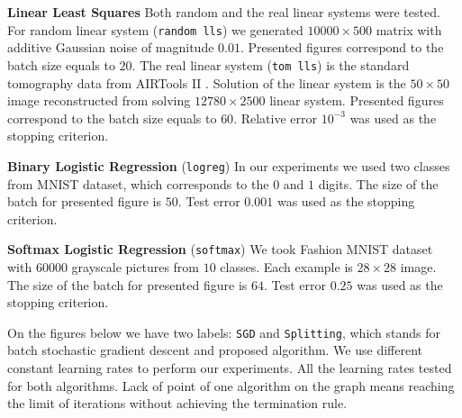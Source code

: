 \documentclass{article}
\begin{document}
\textbf{Linear Least Squares}  Both random and the real linear systems were tested. For random linear system (\texttt{random lls}) we generated $10000\times500$ matrix with additive Gaussian noise of magnitude $0.01$. Presented figures correspond to the batch size equals to $20$. The real linear system (\texttt{tom lls}) is the standard tomography data from AIRTools II \citet{hansen2018air}. Solution of the linear system is the $50 \times 50$ image reconstructed from solving $12780 \times 2500$ linear system. Presented figures correspond to the batch size equals to $60$. Relative error $10^{-3}$ was used as the stopping criterion.

\textbf{Binary Logistic Regression}  (\texttt{logreg}) In our experiments we used two classes from MNIST \citet{lecun1998gradient} dataset, which corresponds to the $0$ and $1$ digits. The size of the batch for presented figure is $50$. Test error $0.001$ was used as the stopping criterion.

\textbf{Softmax Logistic Regression} (\texttt{softmax}) We took Fashion MNIST \citet{xiao2017fashion} dataset with $60000$ grayscale pictures from $10$ classes. Each example is $28 \times 28$ image. The size of the batch for presented figure is $64$. Test error $0.25$ was used as the stopping criterion.

On the figures below we have two labels: \texttt{SGD} and \texttt{Splitting}, which stands for batch stochastic gradient descent and proposed algorithm. We use different constant learning rates to perform our experiments. All the learning rates tested for both algorithms. Lack of point of one algorithm on the graph means reaching the limit of iterations without achieving the termination rule.
\end{document}
